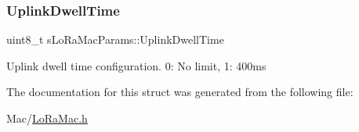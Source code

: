 \subsubsection{\texorpdfstring{Uplink\+Dwell\+Time}{UplinkDwellTime}}
{\footnotesize\ttfamily uint8\+\_\+t s\+Lo\+Ra\+Mac\+Params\+::\+Uplink\+Dwell\+Time}

Uplink dwell time configuration. 0\+: No limit, 1\+: 400ms 

The documentation for this struct was generated from the following file\+:\begin{DoxyCompactItemize}
\item 
Mac/\hyperlink{LoRaMac_8h}{Lo\+Ra\+Mac.\+h}\end{DoxyCompactItemize}
